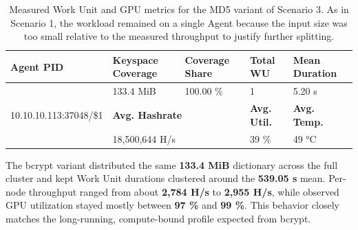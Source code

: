 \begin{table}[hbt]
    \centering
    \caption{Measured Work Unit and GPU metrics for the MD5 variant of Scenario 3. As in Scenario 1, the workload remained on a single Agent because the input size was too small relative to the measured throughput to justify further splitting.}
    \label{tab:scenario3_md5}
    \footnotesize
    \hline
    \begin{tabularx}{\textwidth}{|l|l|l|l|l|}
         \textbf{Agent PID} & \multicolumn{1}{l|}{\textbf{Keyspace Coverage}} & \textbf{Coverage Share} & \textbf{Total WU} & \textbf{Mean Duration} \\ \hline
         \multirow{3}{*}{10.10.10.113:37048/\$1} & \multicolumn{1}{l|}{133.4 MiB} & 100.00 \% & 1 & 5.20 s \\ \cline{2-5}
         & \multicolumn{2}{l|}{\textbf{Avg. Hashrate}} & \textbf{Avg. Util.} & \textbf{Avg. Temp.} \\ \cline{2-5}
         & \multicolumn{2}{l|}{18,500,644 H/s} & 39 \% & 49 °C \\ \hline
    \end{tabularx}
\end{table}

The bcrypt variant distributed the same \textbf{133.4 MiB} dictionary across the full cluster and kept Work Unit durations clustered around the \textbf{539.05 s} mean. Per-node throughput ranged from about \textbf{2,784 H/s} to \textbf{2,955 H/s}, while observed GPU utilization stayed mostly between \textbf{97 \%} and \textbf{99 \%}. This behavior closely matches the long-running, compute-bound profile expected from bcrypt.

